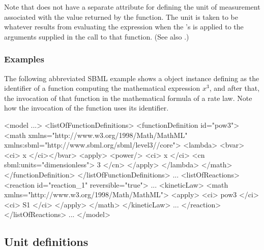 Note that \FunctionDefinition does not have a separate attribute
for defining the unit of measurement associated with the value
returned by the function.  The unit is taken to be whatever
results from evaluating the expression when the
\FunctionDefinition's  is applied to the arguments
supplied in the call to that function.  (See also
.)


\subsubsection{Examples}

The following abbreviated SBML example shows a \FunctionDefinition
object instance defining  as the identifier of a function
computing the mathematical expression $x^{3}$, and after that, the
invocation of that function in the mathematical formula of a rate
law.  Note how the invocation of the function uses its identifier.

\begin{example}
<model ...>
   <listOfFunctionDefinitions>
       <functionDefinition id="pow3">
           <math xmlns="http://www.w3.org/1998/Math/MathML"
                 xmlns:sbml="http://www.sbml.org/sbml/level3/\thisvlc/core">
               <lambda>
                   <bvar><ci> x </ci></bvar>
                   <apply>
                       <power/>
                       <ci> x </ci>
                       <cn sbml:units="dimensionless"> 3 </cn> 
                   </apply>
               </lambda>
           </math>
       </functionDefinition>
   </listOfFunctionDefinitions>
   ...
   <listOfReactions>
       <reaction id="reaction_1" reversible="true">
           ...
           <kineticLaw>
               <math xmlns="http://www.w3.org/1998/Math/MathML">
                   <apply> 
                       <ci> pow3 </ci>
                       <ci> S1 </ci> 
                   </apply>
               </math>
           </kineticLaw>
           ...
       </reaction>
   </listOfReactions>
   ...
</model>\end{example}


\subsection{Unit definitions}
\label{sec:unitdefinitions}

